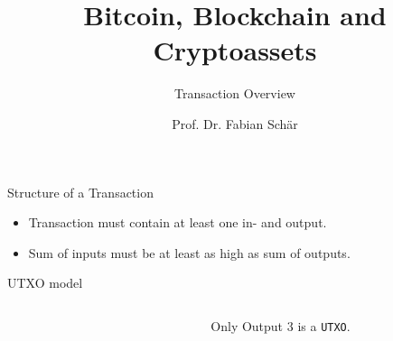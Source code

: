 \documentclass[]{beamer}
\title{Bitcoin, Blockchain and Cryptoassets}
\subtitle{Transaction Overview}
\author{Prof. Dr. Fabian Schär}
\institute{University of Basel}
\begin{document}
\thispagestyle{empty}
\begin{frame}[noframenumbering]
	\titlepage
\end{frame}


\begin{frame}{Structure of a Transaction}
	\centering
	\begin{figure}
	
	\end{figure} 
\vspace{1em}
\begin{itemize}
  	\item<2->{Transaction must contain at least one in- and output.}
  	\item<3->{Sum of inputs must be at least as high as sum of outputs.}
\end{itemize}
\end{frame}	


\begin{frame}{UTXO model}

\begin{columns}
  \begin{column}{0.7\textwidth}
    \begin{figure}[h!]
    \center
    
    \end{figure}
  \end{column}
  
  \begin{column}{0.3\textwidth}
  Only Output 3 is a \texttt{UTXO}.
  \end{column}
\end{columns}
\end{frame}
\end{document}
